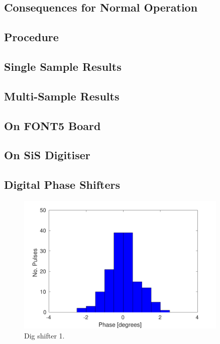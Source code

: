 \subsection{Consequences for Normal Operation}
\label{ss:sigGenConsq}


\subsection{Procedure}
\label{ss:calProcedure}

\subsection{Single Sample Results}
\label{ss:calSingSamp}

\subsection{Multi-Sample Results}
\label{ss:calMultiSamp}


\subsection{On FONT5 Board}
\label{ss:font5Noise}

\subsection{On SiS Digitiser}
\label{ss:sisNoise}


\subsection{Digital Phase Shifters}
\label{ss:digShiftNoise}

\begin{figure}
  \centering
  \includegraphics[width=0.9\textwidth]{Figures/phaseMons/PhMon_HistDig1}
  \caption{Dig shifter 1.}
  \label{f:PhMon_HistDig1}
\end{figure}

